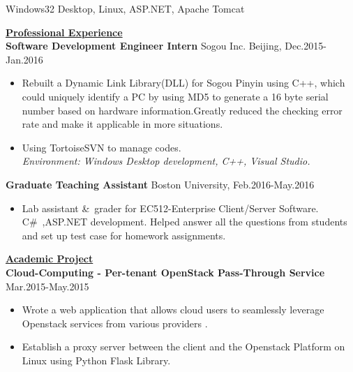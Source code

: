 \documentclass{resume} %
\begin{document}
\begin{spacing}{1}
\begin{center}
\hspace{-6cm}{\bf Environment:} \hspace{1.55cm} {Windows32 Desktop, Linux, ASP.NET, Apache Tomcat } \\

\vspace{4mm}

\uline{{\bf{\LARGE Professional Experience}}\hfill{\hspace{10cm}{}}} \\
\vspace{1mm}
{\bf Software Development Engineer Intern} \hfill {\small Sogou Inc. Beijing, Dec.2015-Jan.2016} \\
\vspace{-0mm}
\begin{itemize}
\item{Rebuilt a Dynamic Link Library(DLL) for Sogou Pinyin using C++, which could uniquely identify a PC by using MD5 to generate a 16 byte serial number based on hardware information.Greatly reduced the checking error rate and make it applicable in more situations.}\\
\item{Using TortoiseSVN to manage codes.}\\
    \hspace{-9mm}\textit{Environment: Windows Desktop development, C++, Visual Studio.}
\end{itemize}
{\bf Graduate Teaching Assistant } \hfill {\small Boston University,  Feb.2016-May.2016} \\
\vspace{-0mm}
\begin{itemize}
\item{ Lab assistant \&\ grader for EC512-Enterprise Client/Server Software. C\#\ ,ASP.NET development. Helped answer all the questions from students and set up test case for homework assignments.}\\

\end{itemize}
\vspace{-1mm}
\vspace{2.5mm}
\uline{{\bf{\LARGE Academic Project}}\hfill{\hspace{10cm}{}}} \\
\vspace{1mm}	
{\bf Cloud-Computing - Per-tenant OpenStack Pass-Through Service } \hfill {\small Mar.2015-May.2015} \\
\vspace{-0mm}
\begin{itemize}
\item{Wrote a web application that allows cloud users to seamlessly leverage Openstack services from various providers
.} \\
\item{Establish a proxy server between the client and the Openstack Platform on Linux using Python Flask Library.} \\


\end{itemize}
\end{center}
\end{spacing}
\end{document}
